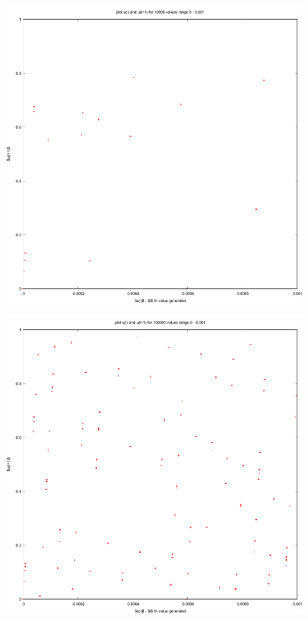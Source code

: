 \documentclass{article}
\begin{document}
\includegraphics[scale=0.45]{"dataplot1e"}\pagebreak

\includegraphics[scale=0.45]{"dataplot1f"}
\pagebreak
\end{document}
